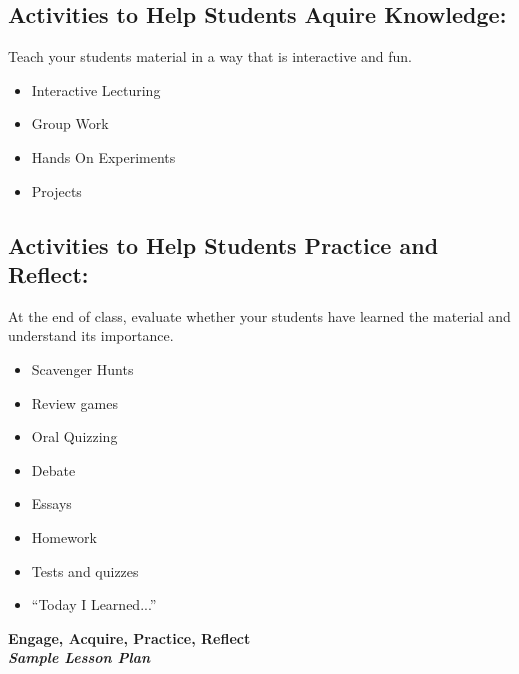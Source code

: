 \subsection{Activities to Help Students Aquire Knowledge:}
Teach your students material in a way that is interactive and fun.  
\begin{itemize}
 \item Interactive Lecturing
 \item Group Work
 \item Hands On Experiments
 \item Projects
\end{itemize}

\subsection{Activities to Help Students Practice and Reflect:}
At the end of class, evaluate whether your students have learned the material and understand its importance.
\begin{itemize}
 \item Scavenger Hunts
 \item Review games
 \item Oral Quizzing
 \item Debate
 \item Essays
 \item Homework
 \item Tests and quizzes
 \item ``Today I Learned...''
\end{itemize}

\newpage
\begin{center}
\textbf{Engage, Acquire, Practice, Reflect\\ \textit{Sample Lesson Plan}}\\
\end{center}
\textbf{\textit{ }}\\

